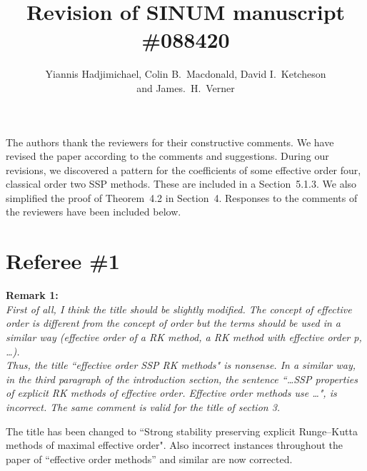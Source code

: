 \documentclass[12pt]{article}
\newcommand{\remark}[2]{\vspace{25pt} \noindent \textbf{Remark #1:\newline} \textit{#2}\vspace{15pt}}
\renewcommand{\newline}{\vspace{15pt}\\}
\begin{document}
\title{Revision of SINUM manuscript \#088420}
\author{Yiannis Hadjimichael, Colin B.~Macdonald, David I.~Ketcheson \\ and  James.~H.~Verner}
\date{}
\maketitle

The authors thank the reviewers for their constructive comments.
We have revised the paper according to the comments and suggestions.
During our revisions, we discovered a pattern for the coefficients of some effective order four, 
classical order two SSP methods.
These are included in a Section~5.1.3.
We also simplified the proof of Theorem~4.2 in Section~4.
Responses to the comments of the reviewers have been included below.
\vspace{30pt}

\section*{Referee \#1}
\remark{1}
{First of all, I think the title should be slightly modified. 
The concept of \textit{effective order} is different from the concept of \textit{order} 
but the terms should be used in a similar way (\textit{effective order of a RK method, 
a RK method with effective order p, \dots}).
\newline
Thus, the title ``effective order SSP RK methods" is nonsense.
In a similar way, in the third paragraph of the introduction section, the sentence 
``\dots SSP properties of explicit RK methods of effective order. Effective order 
methods use \dots", is incorrect.
The same comment is valid for the title of section 3.}

The title has been changed to ``Strong stability preserving explicit Runge--Kutta methods of maximal effective order". 
Also incorrect instances throughout the paper of ``effective order methods'' and similar are now corrected.
\end{document}
